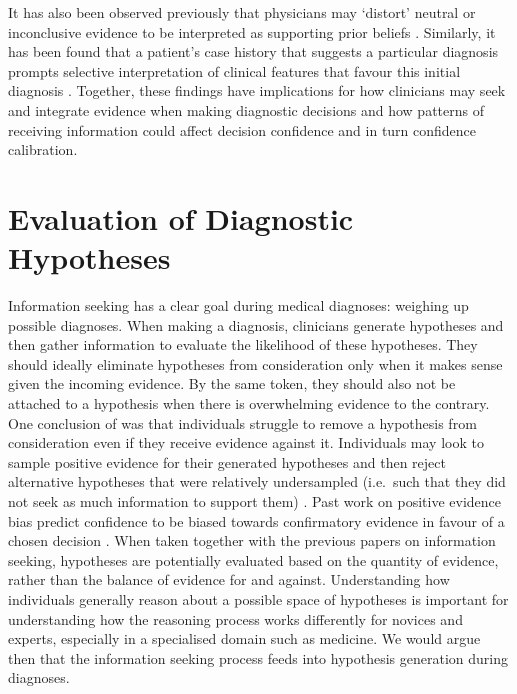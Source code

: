 \documentclass[a4paper, nobind]{templates/ociamthesis}
\begin{document}
\hfill\break
It has also been observed previously that physicians may `distort' neutral or inconclusive evidence to be interpreted as supporting prior beliefs \autocite{kostopoulou_information_2012}. Similarly, it has been found that a patient's case history that suggests a particular diagnosis prompts selective interpretation of clinical features that favour this initial diagnosis \autocite{leblanc_believing_2002}. Together, these findings have implications for how clinicians may seek and integrate evidence when making diagnostic decisions and how patterns of receiving information could affect decision confidence and in turn confidence calibration.

\section*{Evaluation of Diagnostic Hypotheses}\label{evaluation-of-diagnostic-hypotheses}

Information seeking has a clear goal during medical diagnoses: weighing up possible diagnoses. When making a diagnosis, clinicians generate hypotheses and then gather information to evaluate the likelihood of these hypotheses. They should ideally eliminate hypotheses from consideration only when it makes sense given the incoming evidence. By the same token, they should also not be attached to a hypothesis when there is overwhelming evidence to the contrary. One conclusion of \textcite{wason_failure_1960} was that individuals struggle to remove a hypothesis from consideration even if they receive evidence against it. Individuals may look to sample positive evidence for their generated hypotheses and then reject alternative hypotheses that were relatively undersampled (i.e.~such that they did not seek as much information to support them) \autocite{hunt_approach-induced_2016}. Past work on positive evidence bias predict confidence to be biased towards confirmatory evidence in favour of a chosen decision \autocite{peters_perceptual_2017}. When taken together with the previous papers on information seeking, hypotheses are potentially evaluated based on the quantity of evidence, rather than the balance of evidence for and against. Understanding how individuals generally reason about a possible space of hypotheses is important for understanding how the reasoning process works differently for novices and experts, especially in a specialised domain such as medicine. We would argue then that the information seeking process feeds into hypothesis generation during diagnoses.
\end{document}
